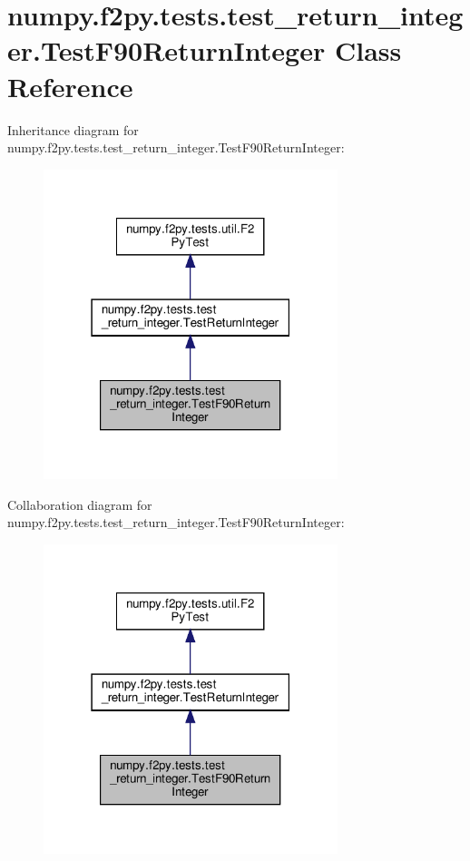\hypertarget{classnumpy_1_1f2py_1_1tests_1_1test__return__integer_1_1TestF90ReturnInteger}{}\section{numpy.\+f2py.\+tests.\+test\+\_\+return\+\_\+integer.\+Test\+F90\+Return\+Integer Class Reference}
\label{classnumpy_1_1f2py_1_1tests_1_1test__return__integer_1_1TestF90ReturnInteger}


Inheritance diagram for numpy.\+f2py.\+tests.\+test\+\_\+return\+\_\+integer.\+Test\+F90\+Return\+Integer\+:
\nopagebreak
\begin{figure}[H]
\begin{center}
\leavevmode
\includegraphics[width=243pt]{classnumpy_1_1f2py_1_1tests_1_1test__return__integer_1_1TestF90ReturnInteger__inherit__graph}
\end{center}
\end{figure}


Collaboration diagram for numpy.\+f2py.\+tests.\+test\+\_\+return\+\_\+integer.\+Test\+F90\+Return\+Integer\+:
\nopagebreak
\begin{figure}[H]
\begin{center}
\leavevmode
\includegraphics[width=243pt]{classnumpy_1_1f2py_1_1tests_1_1test__return__integer_1_1TestF90ReturnInteger__coll__graph}
\end{center}
\end{figure}
